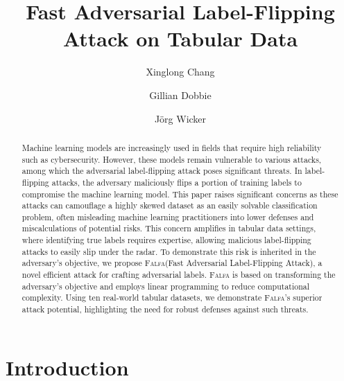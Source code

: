 \documentclass[runningheads]{llncs}
\newcommand{\falfa}{\textsc{Falfa}\xspace}
\begin{document}
\title{Fast Adversarial Label-Flipping Attack on Tabular Data}

\author{
    Xinglong Chang \and
    Gillian Dobbie \and
    J\"org Wicker
}



\maketitle

\begin{abstract}
Machine learning models are increasingly used in fields that require high reliability such as cybersecurity. However, these models remain vulnerable to various attacks, among which the adversarial label-flipping attack poses significant threats. 
In label-flipping attacks, the adversary maliciously flips a portion of training labels to compromise the machine learning model. 
This paper raises significant concerns as these attacks can camouflage a highly skewed dataset as an easily solvable classification problem, often misleading machine learning practitioners into lower defenses and miscalculations of potential risks. This concern amplifies in tabular data settings, where identifying true labels requires expertise, allowing malicious label-flipping attacks to easily slip under the radar. 
To demonstrate this risk is inherited in the adversary's objective, we propose \falfa (Fast Adversarial Label-Flipping Attack), a novel efficient attack for crafting adversarial labels. \falfa is based on transforming the adversary's objective and employs linear programming to reduce computational complexity. 
Using ten real-world tabular datasets, we demonstrate \falfa's superior attack potential, highlighting the need for robust defenses against such threats.

\end{abstract}


\section{Introduction}
\end{document}
